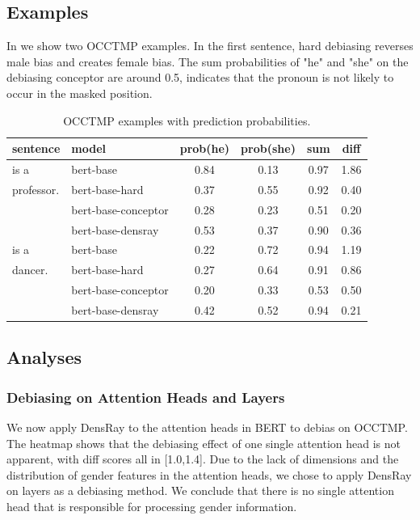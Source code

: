\subsection{Examples}
In  we show two OCCTMP examples. In the first sentence, hard debiasing reverses male bias and creates female bias. The sum probabilities of "he" and "she" on the debiasing conceptor are around 0.5, indicates that the pronoun is not likely to occur in the masked position.
\begin{table}[h]
	\centering
	\footnotesize
	\begin{tabular}{llcccc}
		\hline
		sentence & model & prob(he) & prob(she) &sum&diff\\
		\hline
		[MASK] is a & bert-base & 0.84 & 0.13&0.97&1.86\\
		professor.& bert-base-hard& 0.37 & 0.55&0.92&0.40\\
		& bert-base-conceptor& 0.28 & 0.23&0.51&{0.20}\\
		& bert-base-densray & 0.53 & 0.37&0.90&0.36\\
		\hline
		[MASK] is a & bert-base & 0.22 & 0.72&0.94&1.19\\
		dancer.  & bert-base-hard& 0.27 & 0.64&0.91&0.86\\
		& bert-base-conceptor& 0.20 & 0.33&0.53&0.50\\
		& bert-base-densray& 0.42 & 0.52&0.94&0.21\\
		\hline
	\end{tabular}
	\caption{
		OCCTMP examples with prediction probabilities.}
\end{table}


\subsection{Analyses}

\subsubsection{Debiasing on Attention Heads and Layers}
We now apply DensRay to the attention heads in BERT to debias on OCCTMP. The heatmap  shows that the debiasing effect of one single attention head is not apparent, with diff scores all in [1.0,1.4]. Due to the lack of dimensions and the distribution of gender features in the attention heads, we chose to apply DensRay on layers as a debiasing method. We conclude that there is no single attention head that is responsible for processing gender information.

